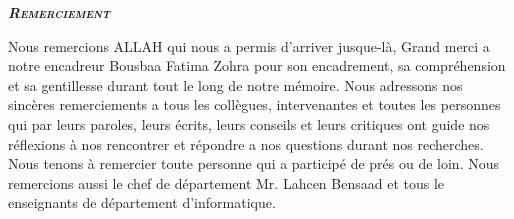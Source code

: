 \documentclass[french,a4,12pt]{report}
\begin{document}
\newpage
\begin{center}
\textbf{\huge \textsc{\itshape Remerciement}}
\end{center}
\textsf{\qquad Nous remercions ALLAH qui nous a permis d’arriver jusque-là, Grand merci a notre encadreur Bousbaa Fatima Zohra  pour son encadrement, sa compréhension et sa gentillesse durant tout le long de notre mémoire. Nous adressons nos sincères remerciements a tous les collègues, intervenantes et toutes les personnes qui par leurs paroles, leurs écrits, leurs conseils et leurs critiques ont guide nos réflexions  à nos rencontrer et répondre a nos questions durant nos recherches. Nous tenons à remercier toute personne qui a participé de prés ou de loin.
Nous remercions aussi le chef de département Mr. Lahcen Bensaad et tous le enseignants de département d'informatique.}



















\end{document}
